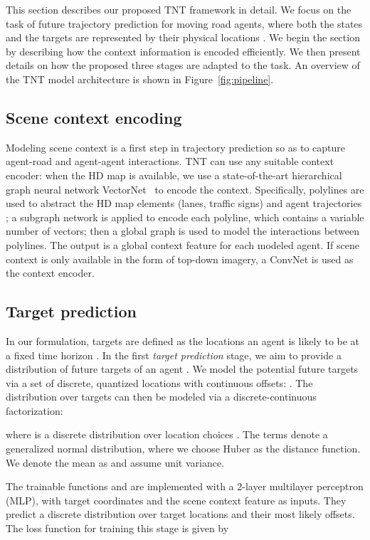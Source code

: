 \documentclass{article}
\newcommand{\model}{TNT\xspace}
\begin{document}
This section describes our proposed \model framework in detail. We focus on the task of future trajectory prediction for moving road agents, where both the states and the targets are represented by their physical locations . We begin the section by describing how the context information is encoded efficiently. We  then present details on how the proposed three stages are adapted to  the task. An overview of the \model 
model architecture is shown in Figure~\ref{fig:pipeline}.


\subsection{Scene context encoding}
\label{sec:context}

Modeling scene context is a first step in trajectory prediction so as to capture agent-road and agent-agent interactions. \model can use any suitable context encoder: when the HD map is available, we use a state-of-the-art hierarchical graph neural network VectorNet~\cite{gao2020vectornet} to encode the context. Specifically, polylines are used to abstract the HD map elements  (lanes, traffic signs) and agent trajectories ; a subgraph network is applied to encode each polyline, which contains a variable number of vectors; then a global graph is used to model the interactions between polylines. 
The output is a global context feature  for each modeled agent.
If scene context is only available in the form of top-down imagery, a ConvNet is used as the context encoder.


\subsection{Target prediction}
\label{sec:stage1}

In our formulation, targets  are defined as the locations  an agent is likely to be at  a fixed time horizon .
In the first \textit{target prediction} stage, we aim to provide a distribution of future targets of an agent . We model the potential future targets via a set of  discrete, quantized locations with continuous offsets: .
The distribution over targets can then be modeled via a discrete-continuous factorization:

where  is a discrete distribution over location choices . The terms  denote a generalized normal distribution, where we choose Huber as the distance function. We denote the mean as   and assume unit variance.


The trainable functions  and  are implemented with a 2-layer multilayer perceptron (MLP), with target coordinates  and the scene context feature  as inputs.
They predict a discrete distribution over target locations and their most likely offsets. The loss function for training this stage is given by 
\end{document}
